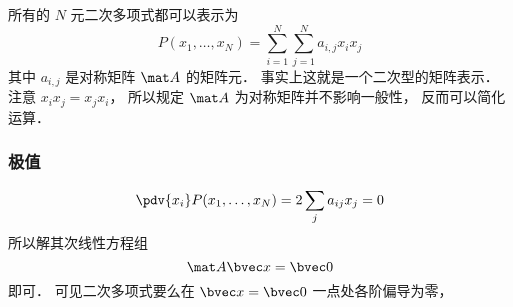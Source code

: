 

所有的 $N$ 元二次多项式都可以表示为
\begin{equation}
P(x_1,\dots,x_N) = \sum_{i=1}^N\sum_{j=1}^N a_{i,j}x_i x_j
\end{equation}
其中 $a_{i,j}$ 是对称矩阵 $\mat A$ 的矩阵元． 事实上这就是一个二次型的矩阵表示． 注意 $x_i x_j = x_j x_i$， 所以规定 $\mat A$ 为对称矩阵并不影响一般性， 反而可以简化运算．

\subsubsection{极值}
\begin{equation}
\pdv{x_i}P(x_1,\dots,x_N) = 2\sum_j a_{ij} x_j = 0
\end{equation}
所以解其次线性方程组
\begin{equation}
\mat A \bvec x = \bvec 0
\end{equation}
即可． 可见二次多项式要么在 $\bvec x = \bvec 0$ 一点处各阶偏导为零， 

